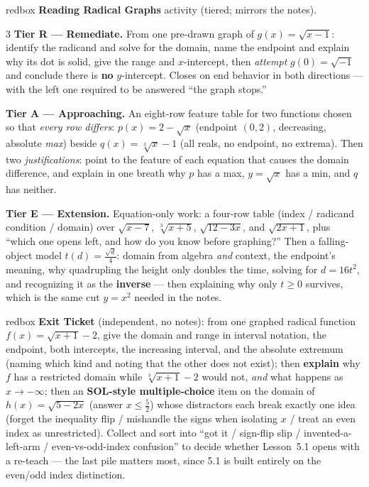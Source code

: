 \documentclass[10pt]{article}
\begin{document}
\begin{skillbox}{redbox}
\textbf{Reading Radical Graphs} activity (tiered; mirrors the notes).
\begin{multicols}{3}
\textbf{Tier R --- Remediate.} From one pre-drawn graph of $g(x)=\sqrt{x-1}$: identify the radicand
and solve for the domain, name the endpoint and explain why its dot is solid, give the range and
$x$-intercept, then \emph{attempt} $g(0)=\sqrt{-1}$ and conclude there is \textbf{no} $y$-intercept.
Closes on end behavior in both directions --- with the left one required to be answered ``the graph
stops.''

\columnbreak
\textbf{Tier A --- Approaching.} An eight-row feature table for two functions chosen so that
\emph{every row differs}: $p(x)=2-\sqrt{x}$ (endpoint $(0,2)$, decreasing, absolute \emph{max}) beside
$q(x)=\sqrt[3]{x}-1$ (all reals, no endpoint, no extrema). Then two \emph{justifications}: point to
the feature of each equation that causes the domain difference, and explain in one breath why $p$ has
a max, $y=\sqrt{x}$ has a min, and $q$ has neither.

\columnbreak
\textbf{Tier E --- Extension.} Equation-only work: a four-row table (index / radicand condition /
domain) over $\sqrt{x-7}$, $\sqrt[3]{x+5}$, $\sqrt{12-3x}$, and $\sqrt{2x+1}$, plus ``which one opens
left, and how do you know before graphing?'' Then a falling-object model $t(d)=\frac{\sqrt{d}}{4}$:
domain from algebra \emph{and} context, the endpoint's meaning, why quadrupling the height only doubles
the time, solving for $d=16t^2$, and recognizing it as the \textbf{inverse} --- then explaining why
only $t\ge0$ survives, which is the same cut $y=x^2$ needed in the notes.
\end{multicols}
\end{skillbox}

\begin{skillbox}{redbox}
\textbf{Exit Ticket} (independent, no notes): from one graphed radical function
$f(x)=\sqrt{x+1}-2$, give the domain and range in interval notation, the endpoint, both intercepts,
the increasing interval, and the absolute extremum (naming which kind and noting that the other does
not exist); then \textbf{explain} why $f$ has a restricted domain while $\sqrt[3]{x+1}-2$ would not,
\emph{and} what happens as $x\to-\infty$; then an \textbf{SOL-style multiple-choice} item on the domain
of $h(x)=\sqrt{5-2x}$ (answer $x\le\frac52$) whose distractors each break exactly one idea (forget the
inequality flip / mishandle the signs when isolating $x$ / treat an even index as unrestricted).
Collect and sort into ``got it / sign-flip slip / invented-a-left-arm / even-vs-odd-index confusion''
to decide whether Lesson~5.1 opens with a re-teach --- the last pile matters most, since 5.1 is built
entirely on the even/odd index distinction.
\end{skillbox}
\end{document}
